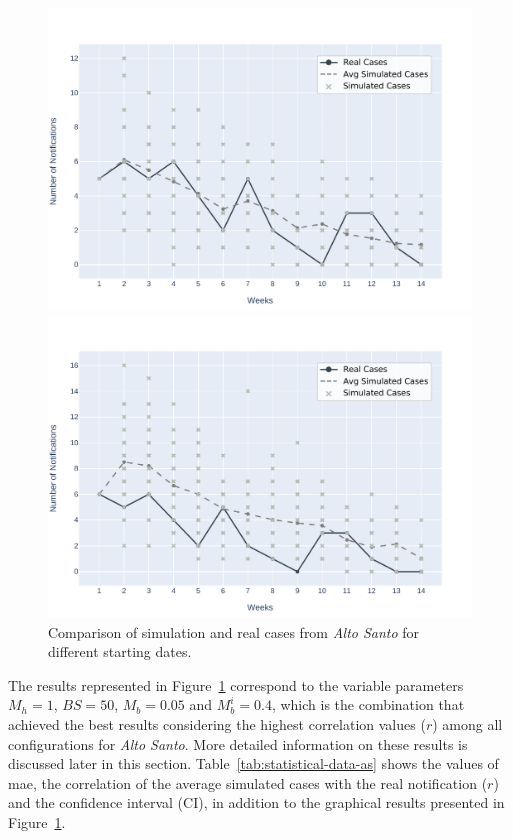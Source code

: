 \begin{figure}[!ht]
\begin{minipage}[c]{.45\textwidth}
        \includegraphics[scale=0.4]{images/experiments-as/AS-2021-05-30.pdf}
      \end{minipage}
      \hspace{0.5cm}
      \begin{minipage}[c]{.45\textwidth}
        \centering
        \includegraphics[scale=0.4]{images/experiments-as/AS-2021-06-06.pdf}
      \end{minipage}
    \caption{\label{fig:avg-result-2017-01-as} Comparison of simulation and real cases from \textit{Alto Santo} for different starting dates.}
\end{figure}

The results represented in Figure~\ref{fig:avg-result-2017-01-as} correspond to the variable parameters $M_h = 1$, $BS = 50$, $M_b = 0.05$ and $M_b^{i} = 0.4$, which is the combination that achieved the best results considering the highest correlation values ($r$) among all configurations for \textit{Alto Santo}. More detailed information on these results is discussed later in this section.
%
Table~\ref{tab:statistical-data-as} shows the values of \gls{mae}, the correlation of the average simulated cases with the real notification ($r$) and the confidence interval (CI), in addition to the graphical results presented in Figure~\ref{fig:avg-result-2017-01-as}.


